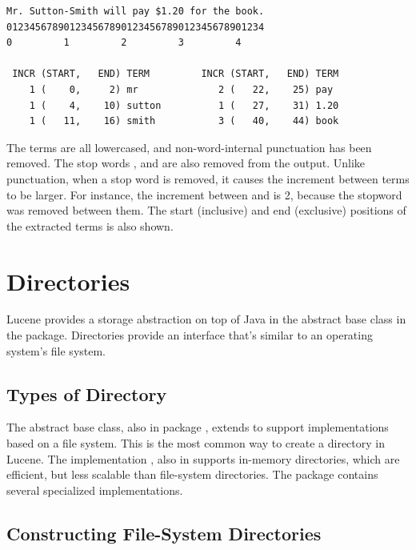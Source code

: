 \begin{verbatim}
Mr. Sutton-Smith will pay $1.20 for the book.
012345678901234567890123456789012345678901234
0         1         2         3         4

 INCR (START,   END) TERM         INCR (START,   END) TERM
    1 (    0,     2) mr              2 (   22,    25) pay
    1 (    4,    10) sutton          1 (   27,    31) 1.20
    1 (   11,    16) smith           3 (   40,    44) book
\end{verbatim}
%
The terms are all lowercased, and non-word-internal punctuation has
been removed.  The stop words , 
and  are also removed from the output.  Unlike
punctuation, when a stop word is removed, it causes the increment
between terms to be larger.  For instance, the increment between
 and  is 2, because the stopword
 was removed between them.  The start (inclusive)
and end (exclusive) positions of the extracted terms is also shown.


\section{Directories}\label{section:lucene-directory}

Lucene provides a storage abstraction on top of Java in the abstract
base class  in the 
package.  Directories provide an interface that's similar to an
operating system's file system.

\subsection{Types of Directory}

The  abstract base class, also in package
, extends  to support implementations
based on a file system.  This is the most common way to create a
directory in Lucene.  The implementation , also in
 supports in-memory directories, which are efficient, but
less scalable than file-system directories.  The package
 contains several specialized
implementations.

\subsection{Constructing File-System Directories}

